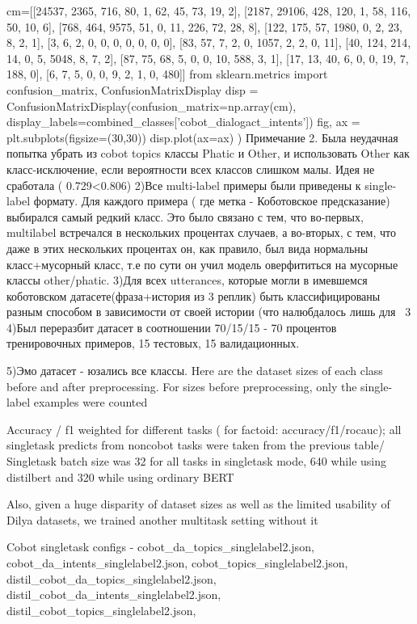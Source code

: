 cm=[[24537, 2365, 716, 80, 1, 62, 45, 73, 19, 2], [2187, 29106, 428, 120, 1, 58, 116, 50, 10, 6], [768, 464, 9575, 51, 0, 11, 226, 72, 28, 8], [122, 175, 57, 1980, 0, 2, 23, 8, 2, 1], [3, 6, 2, 0, 0, 0, 0, 0, 0, 0], [83, 57, 7, 2, 0, 1057, 2, 2, 0, 11], [40, 124, 214, 14, 0, 5, 5048, 8, 7, 2], [87, 75, 68, 5, 0, 0, 10, 588, 3, 1], [17, 13, 40, 6, 0, 0, 19, 7, 188, 0], [6, 7, 5, 0, 0, 9, 2, 1, 0, 480]]
from sklearn.metrics import confusion_matrix, ConfusionMatrixDisplay
disp = ConfusionMatrixDisplay(confusion_matrix=np.array(cm), display_labels=combined_classes['cobot_dialogact_intents'])
fig, ax = plt.subplots(figsize=(30,30))
disp.plot(ax=ax)
)
Примечание 2. Была неудачная попытка убрать из cobot topics классы Phatic и Other, и использовать Other как класс-исключение, если вероятности всех классов слишком малы. Идея не сработала ( 0.729<0.806)
2)Все multi-label примеры были приведены к single-label формату. Для каждого примера ( где метка - Коботовское предсказание) выбирался самый редкий класс. Это было связано с тем, что во-первых, multilabel встречался в нескольких процентах случаев, а во-вторых, с тем, что даже в этих нескольких процентах он, как правило, был вида нормальны класс+мусорный класс, т.е по сути он учил модель оверфититься на мусорные классы other/phatic.
3)Для всех utterances, которые могли в имевшемся коботовском датасете(фраза+история из 3 реплик) быть классифицированы разным способом в зависимости от своей истории (что налюбдалось лишь для ~3%
4)Был переразбит датасет в соотношении 70/15/15 - 70 процентов тренировочных примеров, 15 тестовых, 15 валидационных.

5)Эмо датасет - юзались все классы.
Here are the dataset sizes of each class before and after preprocessing. For sizes before preprocessing, only the single-label examples were counted




Accuracy / f1 weighted for different tasks ( for factoid: accuracy/f1/rocauc); all singletask predicts from noncobot tasks were taken from the previous table/ Singletask batch size was 32 for all tasks in singletask mode, 640 while using distilbert and 320 while using ordinary BERT

Also, given a huge disparity of dataset sizes as well as the limited usability of Dilya datasets, we trained another multitask setting without it

Cobot singletask configs - cobot_da_topics_singlelabel2.json, cobot_da_intents_singlelabel2.json, cobot_topics_singlelabel2.json,
distil_cobot_da_topics_singlelabel2.json, distil_cobot_da_intents_singlelabel2.json, distil_cobot_topics_singlelabel2.json,

